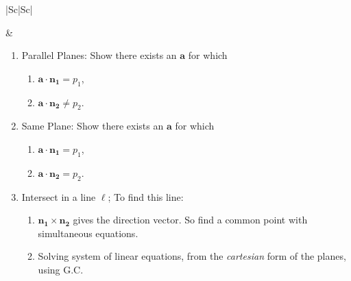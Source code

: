 \documentclass[oneside]{book}
\begin{document}
\begin{longtable}{|Sc|Sc|}
\begin{minipage}{0.5\textwidth}
\begin{enumerate}
\begin{enumerate}
    \end{enumerate}
  \end{enumerate}
\end{minipage} &
\begin{minipage}{0.5\textwidth}
  \begin{enumerate}
    \item Parallel Planes: Show there exists an \(\mathbf{a}\) for which
    \begin{enumerate}
      \item \(\mathbf{a}\cdot \mathbf{n_1}= p_1\),
      \item \(\mathbf{a}\cdot \mathbf{n_2}\neq p_2\).
    \end{enumerate}
    \item Same Plane: Show there exists an \(\mathbf{a}\) for which
    \begin{enumerate}
      \item \(\mathbf{a}\cdot \mathbf{n_1}= p_1\),
      \item \(\mathbf{a}\cdot \mathbf{n_2}= p_2\).
    \end{enumerate}
    \item Intersect in a line \(\ell\); To find this line:
    \begin{enumerate}[label=M\arabic*:]
      \item \(\mathbf{n_1}\times \mathbf{n_2}\) gives the direction vector. So find a common point with simultaneous equations.
      \item Solving system of linear equations, from the \emph{cartesian} form of the planes, using G.C.
    \end{enumerate}
  \end{enumerate}
\end{minipage}\\
\hline
{}\\
\hline 
{}
\end{longtable}
\end{document}
